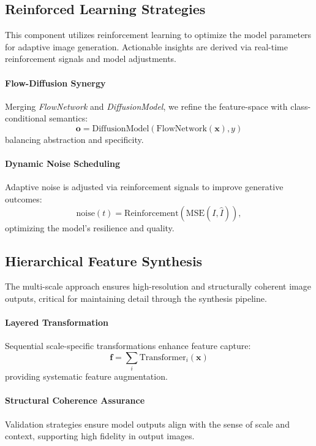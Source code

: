 \subsection{Reinforced Learning Strategies}
This component utilizes reinforcement learning to optimize the model parameters for adaptive image generation. Actionable insights are derived via real-time reinforcement signals and model adjustments.

\paragraph{Flow-Diffusion Synergy}
Merging \emph{FlowNetwork} and \emph{DiffusionModel}, we refine the feature-space with class-conditional semantics:
\begin{equation}
\mathbf{o} = \text{DiffusionModel}(\text{FlowNetwork}(\mathbf{x}), y)
\end{equation}
balancing abstraction and specificity.

\paragraph{Dynamic Noise Scheduling}
Adaptive noise is adjusted via reinforcement signals to improve generative outcomes:
\begin{equation}
\text{noise}(t) = \text{Reinforcement}(\text{MSE}(I, \hat{I})),
\end{equation}
optimizing the model's resilience and quality.

\subsection{Hierarchical Feature Synthesis}
The multi-scale approach ensures high-resolution and structurally coherent image outputs, critical for maintaining detail through the synthesis pipeline.

\paragraph{Layered Transformation}
Sequential scale-specific transformations enhance feature capture:
\begin{equation}
\mathbf{f} = \sum_{i}\text{Transformer}_{i}(\mathbf{x})
\end{equation}
providing systematic feature augmentation.

\paragraph{Structural Coherence Assurance}
Validation strategies ensure model outputs align with the sense of scale and context, supporting high fidelity in output images.

